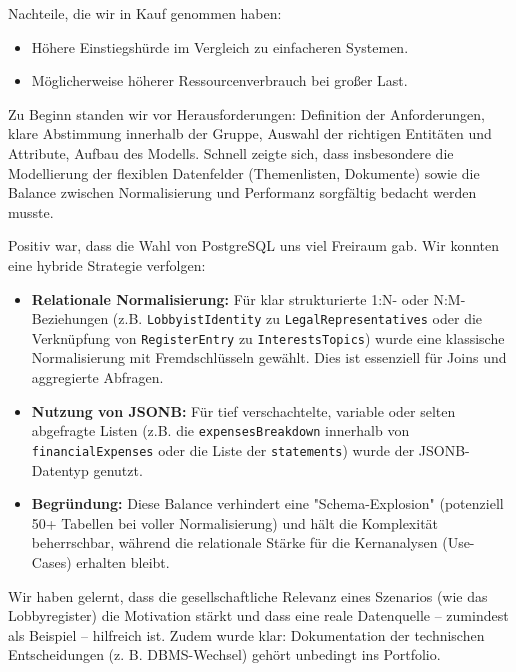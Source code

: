 \documentclass[12pt,twoside=false,a4paper,parskip]{scrbook}
\makeatletter
\renewcommand*{\chapter}{\secdef\@chapter\@schapter}
\makeatother
\begin{document}
Nachteile, die wir in Kauf genommen haben:

\begin{itemize}
  \item Höhere Einstiegshürde im Vergleich zu einfacheren Systemen.  
  \item Möglicherweise höherer Ressourcenverbrauch bei großer Last.  
\end{itemize}

\chapter{Reflexion / Erkenntnisse}
Zu Beginn standen wir vor Herausforderungen: Definition der Anforderungen, klare Abstimmung innerhalb der Gruppe, Auswahl der richtigen Entitäten und Attribute, Aufbau des Modells. Schnell zeigte sich, dass insbesondere die Modellierung der flexiblen Datenfelder (Themenlisten, Dokumente) sowie die Balance zwischen Normalisierung und Performanz sorgfältig bedacht werden musste.

Positiv war, dass die Wahl von PostgreSQL uns viel Freiraum gab. Wir konnten eine hybride Strategie verfolgen:

\begin{itemize}
    \item \textbf{Relationale Normalisierung:} Für klar strukturierte 1:N- oder N:M-Beziehungen (z.B. \texttt{LobbyistIdentity} zu \texttt{LegalRepresentatives} oder die Verknüpfung von \texttt{RegisterEntry} zu \texttt{InterestsTopics}) wurde eine klassische Normalisierung mit Fremdschlüsseln gewählt. Dies ist essenziell für Joins und aggregierte Abfragen.
    
    \item \textbf{Nutzung von JSONB:} Für tief verschachtelte, variable oder selten abgefragte Listen (z.B. die \texttt{expensesBreakdown} innerhalb von \texttt{financialExpenses} oder die Liste der \texttt{statements}) wurde der JSONB-Datentyp genutzt. 
    
    \item \textbf{Begründung:} Diese Balance verhindert eine "Schema-Explosion" (potenziell 50+ Tabellen bei voller Normalisierung) und hält die Komplexität beherrschbar, während die relationale Stärke für die Kernanalysen (Use-Cases) erhalten bleibt.
\end{itemize}

Wir haben gelernt, dass die gesellschaftliche Relevanz eines Szenarios (wie das Lobbyregister) die Motivation stärkt und dass eine reale Datenquelle – zumindest als Beispiel – hilfreich ist. Zudem wurde klar: Dokumentation der technischen Entscheidungen (z. B. DBMS-Wechsel) gehört unbedingt ins Portfolio.
\end{document}
